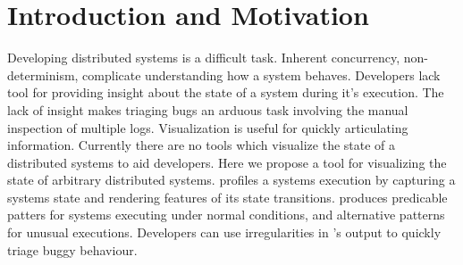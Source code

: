\section{Introduction and Motivation}
\label{sec:intro}

Developing distributed systems is a difficult task. Inherent concurrency,
non-determinism, complicate understanding how a system behaves. Developers
lack tool for providing insight about the state of a system during it's
execution.  The lack of insight makes triaging bugs an arduous task involving
the manual inspection of multiple logs. Visualization is useful for quickly
articulating information. Currently there are no tools which visualize the
state of a distributed systems to aid developers. Here we propose \dviz a tool
for visualizing the state of arbitrary distributed systems. \dviz profiles a
systems execution by capturing a systems state and rendering features of its
state transitions. \dviz produces predicable patters for systems executing
under normal conditions, and alternative patterns for unusual executions.
Developers can use irregularities in \dviz's output to quickly triage buggy
behaviour.
